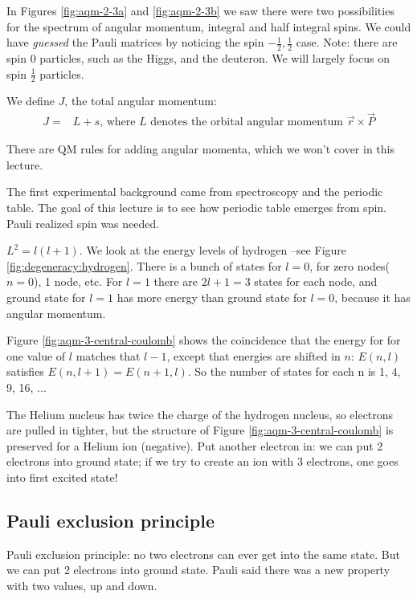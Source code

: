 \documentclass[]{article}
\begin{document}
In Figures \ref{fig:aqm-2-3a} and \ref{fig:aqm-2-3b} we saw there were two possibilities for the spectrum of angular momentum, integral and half integral spins. We could have \emph{guessed} the Pauli matrices by noticing the spin ${-\frac{1}{2},\frac{1}{2}}$ case. Note: there are spin $0$ particles, such as the Higgs, and the deuteron. We will largely focus on spin $\frac{1}{2}$ particles.

We define $J$, the total angular momentum:
\begin{align*}
	J=&L+s \text{, where $L$ denotes the orbital angular momentum $\vec{r}\times\vec{P}$}
\end{align*}

There are QM rules for adding angular momenta, which we won't cover in this lecture.


The first experimental background came from spectroscopy and the periodic table. The goal of this lecture is to see how periodic table emerges from spin. Pauli realized spin was needed.

$L^2=l(l+1)$. We look at the energy levels of hydrogen --see Figure \ref{fig:degeneracy:hydrogen}. There is a bunch of states for $l=0$, for zero nodes($n=0$), 1 node, etc. For $l=1$ there are $2l+1=3$ states for each node, and ground state for $l=1$ has more energy than ground state for $l=0$, because it has angular momentum.

Figure \ref{fig:aqm-3-central-coulomb} shows the coincidence that the  energy for  for one value of $l$ matches that $l-1$, except that energies are shifted in $n$: $E(n,l)$ satisfies $E(n,l+1)=E(n+1,l)$. So the number of states for each n is 1, 4, 9, 16, ...

The Helium nucleus has twice the charge of the hydrogen nucleus, so electrons are pulled in tighter, but the structure of Figure \ref{fig:aqm-3-central-coulomb}  is preserved for a Helium ion (negative). Put another electron in: we can put 2 electrons into ground state; if we try to create an ion with 3 electrons, one goes into first excited state! 

\subsection{Pauli exclusion principle}

Pauli exclusion principle: no two electrons can ever get into the same state. But we can put 2 electrons into ground state. Pauli said there was a new property with two values, up and down.
\end{document}
